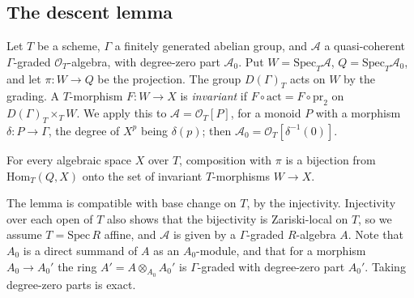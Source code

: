 \subsection{The descent lemma}

Let $T$ be a scheme, $\Gamma$ a finitely generated abelian group, and $\mathcal{A}$ a quasi-coherent $\Gamma$-graded $\mathcal{O}_T$-algebra, with degree-zero part $\mathcal{A}_0$. Put $W=\mathrm{Spec}_T\mathcal{A}$, $Q=\mathrm{Spec}_T\mathcal{A}_0$, and let $\pi\colon W\to Q$ be the projection. The group $D(\Gamma)_T$ acts on $W$ by the grading. A $T$-morphism $F\colon W\to X$ is \emph{invariant} if $F\circ\mathrm{act}=F\circ\mathrm{pr}_2$ on $D(\Gamma)_T\times_T W$. We apply this to $\mathcal{A}=\mathcal{O}_T[P]$, for a monoid $P$ with a morphism $\delta\colon P\to\Gamma$, the degree of $X^p$ being $\delta(p)$; then $\mathcal{A}_0=\mathcal{O}_T[\delta^{-1}(0)]$.

\begin{lemma}\label{lem:D}
For every algebraic space $X$ over $T$, composition with $\pi$ is a bijection from $\mathrm{Hom}_T(Q,X)$ onto the set of invariant $T$-morphisms $W\to X$.
\end{lemma}

The lemma is compatible with base change on $T$, by the injectivity. Injectivity over each open of $T$ also shows that the bijectivity is Zariski-local on $T$, so we assume $T=\mathrm{Spec}\,R$ affine, and $\mathcal{A}$ is given by a $\Gamma$-graded $R$-algebra $A$. Note that $A_0$ is a direct summand of $A$ as an $A_0$-module, and that for a morphism $A_0\to A_0'$ the ring $A'=A\otimes_{A_0}A_0'$ is $\Gamma$-graded with degree-zero part $A_0'$. Taking degree-zero parts is exact.

